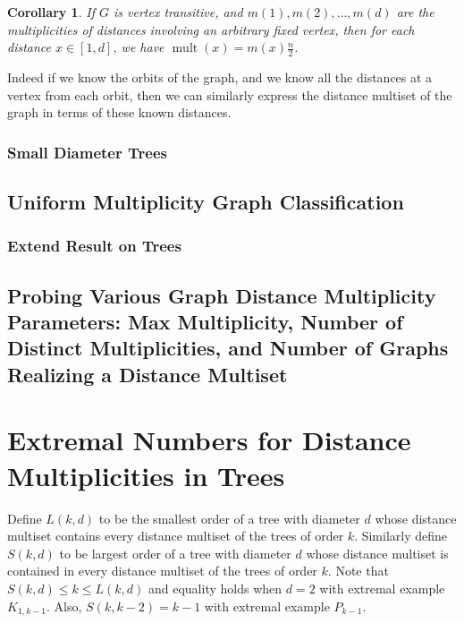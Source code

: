 \documentclass[12]{article}
\DeclareMathOperator{\mult}{mult}
\newtheorem{cor}[thm]{Corollary}
\theoremstyle{definition}
\begin{document}
	\begin{cor}
		If $G$ is vertex transitive, and $m(1), m(2), \ldots, m(d)$ are the multiplicities of distances involving an arbitrary fixed vertex, then for each distance $x \in [1,d]$, we have $\mult(x) = m(x)\tfrac{n}{2}$.
	\end{cor}
	
	Indeed if we know the orbits of the graph, and we know all the distances at a vertex from each orbit, then we can similarly express the distance multiset of the graph in terms of these known distances.
	
	\subsubsection{Small Diameter Trees}
	
	\subsection{Uniform Multiplicity Graph Classification}
	\subsubsection{Extend Result on Trees}
	
	\subsection{Probing Various Graph Distance Multiplicity Parameters: Max Multiplicity, Number of Distinct Multiplicities, and Number of Graphs Realizing a Distance Multiset}
	
	\newpage
	
	\section{Extremal Numbers for Distance Multiplicities in Trees}
	
	Define $L(k,d)$ to be the smallest order of a tree with diameter $d$ whose distance multiset contains every distance multiset of the trees of order $k$.  Similarly define $S(k,d)$ to be largest order of a tree with diameter $d$ whose distance multiset is contained in every distance multiset of the trees of order $k$.  Note that $S(k,d) \leq k \leq L(k,d)$ and equality holds when $d = 2$ with extremal example $K_{1,k-1}$.  Also, $S(k,k-2) = k-1$ with extremal example $P_{k-1}$.
	
\end{document}
